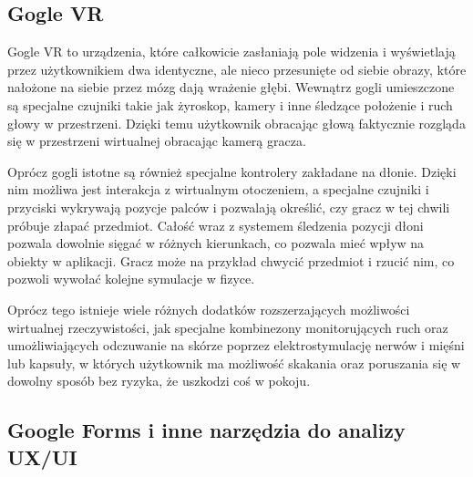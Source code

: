 \subsection{Gogle VR}
Gogle VR to urządzenia, które całkowicie zasłaniają pole widzenia i wyświetlają przez użytkownikiem dwa identyczne, ale nieco przesunięte od siebie obrazy, które nałożone na siebie przez mózg dają wrażenie głębi. Wewnątrz gogli umieszczone są specjalne czujniki takie jak żyroskop, kamery i inne śledzące położenie i ruch głowy w przestrzeni. Dzięki temu użytkownik obracając głową faktycznie rozgląda się w przestrzeni wirtualnej obracając kamerą gracza.

Oprócz gogli istotne są również specjalne kontrolery zakładane na dłonie. Dzięki nim możliwa jest interakcja z wirtualnym otoczeniem, a specjalne czujniki i przyciski wykrywają pozycje palców i pozwalają określić, czy gracz w tej chwili próbuje złapać przedmiot. Całość wraz z systemem śledzenia pozycji dłoni pozwala dowolnie sięgać w różnych kierunkach, co pozwala mieć wpływ na obiekty w aplikacji. Gracz może na przykład chwycić przedmiot i rzucić nim, co pozwoli wywołać kolejne symulacje w fizyce.

Oprócz tego istnieje wiele różnych dodatków rozszerzających możliwości wirtualnej rzeczywistości, jak specjalne kombinezony monitorujących ruch oraz umożliwiających odczuwanie na skórze poprzez elektrostymulację nerwów i mięśni lub kapsuły, w których użytkownik ma możliwość skakania oraz poruszania się w dowolny sposób bez ryzyka, że uszkodzi coś w pokoju.

\subsection{Google Forms i inne narzędzia do analizy UX/UI}










